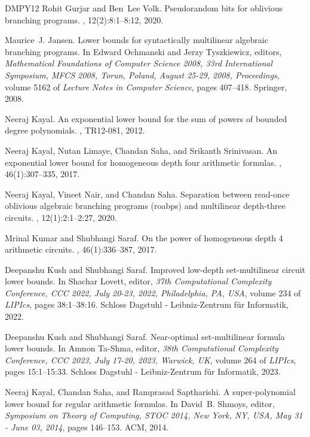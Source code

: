 \documentclass[10pt,a4paper]{article}
\theoremstyle{definition}%
\theoremstyle{plain}
\begin{document}
\begin{thebibliography}{DMPY12}
Rohit Gurjar and Ben~Lee Volk.
\newblock Pseudorandom bits for oblivious branching programs.
, 12(2):8:1--8:12, 2020.

Maurice~J. Jansen.
\newblock Lower bounds for syntactically multilinear algebraic branching
  programs.
\newblock In Edward Ochmanski and Jerzy Tyszkiewicz, editors, {\em Mathematical
  Foundations of Computer Science 2008, 33rd International Symposium, {MFCS}
  2008, Torun, Poland, August 25-29, 2008, Proceedings}, volume 5162 of {\em
  Lecture Notes in Computer Science}, pages 407--418. Springer, 2008.

Neeraj Kayal.
\newblock An exponential lower bound for the sum of powers of bounded degree
  polynomials.
, {TR12-081}, 2012.

Neeraj Kayal, Nutan Limaye, Chandan Saha, and Srikanth Srinivasan.
\newblock An exponential lower bound for homogeneous depth four arithmetic
  formulas.
, 46(1):307--335, 2017.

Neeraj Kayal, Vineet Nair, and Chandan Saha.
\newblock Separation between read-once oblivious algebraic branching programs
  (roabps) and multilinear depth-three circuits.
, 12(1):2:1--2:27, 2020.

Mrinal Kumar and Shubhangi Saraf.
\newblock On the power of homogeneous depth 4 arithmetic circuits.
, 46(1):336--387, 2017.

Deepanshu Kush and Shubhangi Saraf.
\newblock Improved low-depth set-multilinear circuit lower bounds.
\newblock In Shachar Lovett, editor, {\em 37th Computational Complexity
  Conference, {CCC} 2022, July 20-23, 2022, Philadelphia, PA, {USA}}, volume
  234 of {\em LIPIcs}, pages 38:1--38:16. Schloss Dagstuhl - Leibniz-Zentrum
  f{\"{u}}r Informatik, 2022.

Deepanshu Kush and Shubhangi Saraf.
\newblock Near-optimal set-multilinear formula lower bounds.
\newblock In Amnon Ta{-}Shma, editor, {\em 38th Computational Complexity
  Conference, {CCC} 2023, July 17-20, 2023, Warwick, {UK}}, volume 264 of {\em
  LIPIcs}, pages 15:1--15:33. Schloss Dagstuhl - Leibniz-Zentrum f{\"{u}}r
  Informatik, 2023.

Neeraj Kayal, Chandan Saha, and Ramprasad Saptharishi.
\newblock A super-polynomial lower bound for regular arithmetic formulas.
\newblock In David~B. Shmoys, editor, {\em Symposium on Theory of Computing,
  {STOC} 2014, New York, NY, USA, May 31 - June 03, 2014}, pages 146--153.
  {ACM}, 2014.


\end{thebibliography}
\end{document}
